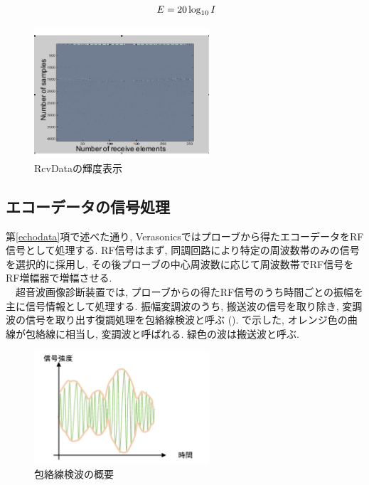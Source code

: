 \begin{equation}
\label{eq.deci}
\\\ E =20 \log_{10} I
\end{equation}
\begin{figure}[h]
  \begin{center}
    \includegraphics[width=65mm]{fig/RcvData_light.pdf}
  \end{center}
  \caption{RcvDataの輝度表示}
\end{figure}
\subsection{エコーデータの信号処理}
第\ref{echodata}項で述べた通り, Verasonicsではプローブから得たエコーデータをRF信号として処理する. RF信号はまず, 同調回路により特定の周波数帯のみの信号を選択的に採用し, その後プローブの中心周波数に応じて周波数帯でRF信号をRF増幅器で増幅させる. 
\\\ \ 超音波画像診断装置では, プローブからの得たRF信号のうち時間ごとの振幅を主に信号情報として処理する. 振幅変調波のうち, 搬送波の信号を取り除き, 変調波の信号を取り出す復調処理を包絡線検波と呼ぶ %
(). で示した, オレンジ色の曲線が包絡線に相当し, 変調波と呼ばれる. 緑色の波は搬送波と呼ぶ. 
\begin{figure}[h]
  \begin{center}
    \includegraphics[width=65mm]{fig/hourakusen.pdf}
  \end{center}
  \caption{包絡線検波の概要}
\end{figure}
